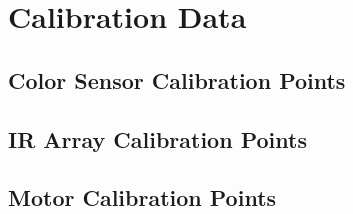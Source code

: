 \documentclass[12pt]{report}
\begin{document}
\chapter{Calibration Data}\label{ch:calibration-data}

\section{Color Sensor Calibration Points}
\label{sc:color-sensor-points}


\section{IR Array Calibration Points}
\label{sc:ir-array-points}


\section{Motor Calibration Points}
\label{sc:motor-points}

\end{document}
